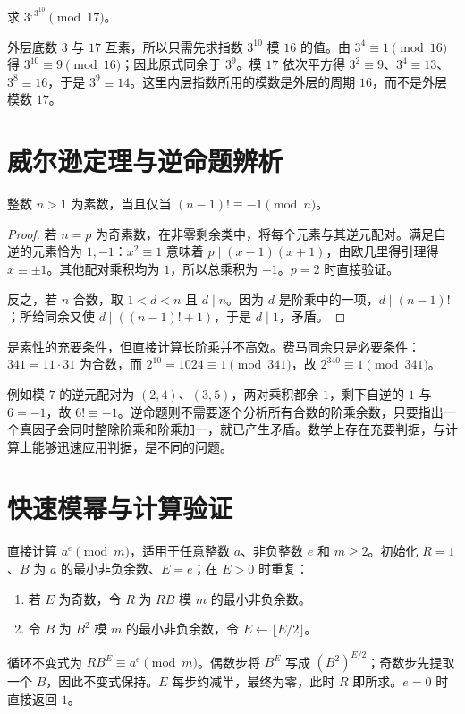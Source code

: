 \documentclass[UTF8,12pt,a4paper,fontset=fandol]{ctexbook}
\begin{document}
\begin{example}[多层幂的模数需要逐层确定]
求 $3^{,3^{10}}\pmod{17}$。
\end{example}
\begin{solve}
外层底数 $3$ 与 $17$ 互素，所以只需先求指数 $3^{10}$ 模 $16$ 的值。由 $3^4\equiv1\pmod{16}$ 得 $3^{10}\equiv9\pmod{16}$；因此原式同余于 $3^9$。模 $17$ 依次平方得 $3^2\equiv9$、$3^4\equiv13$、$3^8\equiv16$，于是 $3^9\equiv14$。这里内层指数所用的模数是外层的周期 $16$，而不是外层模数 $17$。
\end{solve}

\section{威尔逊定理与逆命题辨析}

\begin{theorem}[威尔逊定理]
\label{thm:wilson}
整数 $n>1$ 为素数，当且仅当 $(n-1)!\equiv-1\pmod n$。
\end{theorem}
\begin{proof}
若 $n=p$ 为奇素数，在非零剩余类中，将每个元素与其逆元配对。满足自逆的元素恰为 $1,-1$：$x^2\equiv1$ 意味着 $p\mid(x-1)(x+1)$，由欧几里得引理得 $x\equiv\pm1$。其他配对乘积均为 $1$，所以总乘积为 $-1$。$p=2$ 时直接验证。

反之，若 $n$ 合数，取 $1<d<n$ 且 $d\mid n$。因为 $d$ 是阶乘中的一项，$d\mid(n-1)!$；所给同余又使 $d\mid((n-1)!+1)$，于是 $d\mid1$，矛盾。
\end{proof}

是素性的充要条件，但直接计算长阶乘并不高效。费马同余只是必要条件：$341=11\cdot31$ 为合数，而 $2^{10}=1024\equiv1\pmod{341}$，故 $2^{340}\equiv1\pmod{341}$。

例如模 $7$ 的逆元配对为 $(2,4)$、$(3,5)$，两对乘积都余 $1$，剩下自逆的 $1$ 与 $6=-1$，故 $6!\equiv-1$。逆命题则不需要逐个分析所有合数的阶乘余数，只要指出一个真因子会同时整除阶乘和阶乘加一，就已产生矛盾。数学上存在充要判据，与计算上能够迅速应用判据，是不同的问题。

\section{快速模幂与计算验证}

直接计算 $a^e\pmod m$，适用于任意整数 $a$、非负整数 $e$ 和 $m\ge2$。初始化 $R=1$、$B$ 为 $a$ 的最小非负余数、$E=e$；在 $E>0$ 时重复：
\begin{enumerate}
 \item 若 $E$ 为奇数，令 $R$ 为 $RB$ 模 $m$ 的最小非负余数。
 \item 令 $B$ 为 $B^2$ 模 $m$ 的最小非负余数，令 $E\leftarrow\lfloor E/2\rfloor$。
\end{enumerate}
循环不变式为 $RB^E\equiv a^e\pmod m$。偶数步将 $B^E$ 写成 $(B^2)^{E/2}$；奇数步先提取一个 $B$，因此不变式保持。$E$ 每步约减半，最终为零，此时 $R$ 即所求。$e=0$ 时直接返回 $1$。
\end{document}
